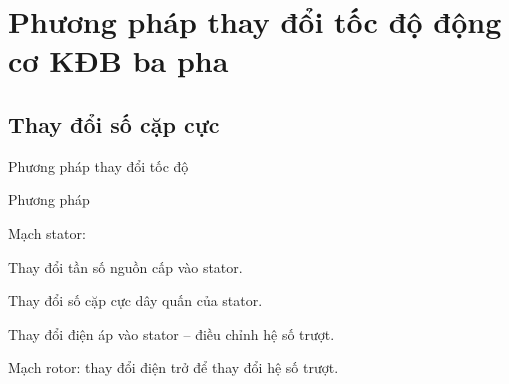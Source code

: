 \documentclass{beamer}
\begin{document}
\section[Thay đổi tốc độ động cơ KĐB ba pha]{Phương pháp thay đổi tốc độ động cơ KĐB ba pha}

\subsection{Thay đổi số cặp cực}
\begin{frame}{Phương pháp thay đổi tốc độ}
	\begin{block}{Phương pháp}
		\justifying
		\begin{list}{--}{}
			\item Mạch stator:
				\begin{list}{+}{}
					\item Thay đổi tần số nguồn cấp vào stator.
					\item Thay đổi số cặp cực dây quấn của stator.
					\item Thay đổi điện áp vào stator -- điều chỉnh hệ số trượt.
				\end{list}
			
			\item Mạch rotor: thay đổi điện trở để thay đổi hệ số trượt.
		\end{list}
	\end{block}
\end{frame}
\end{document}

